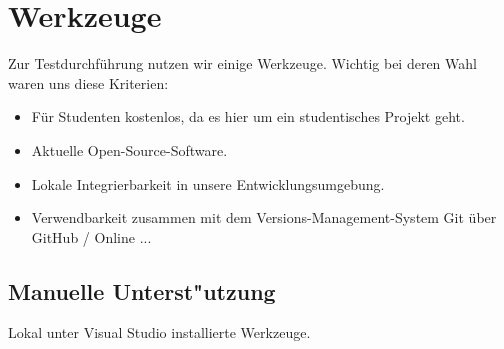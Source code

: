 %



\section{Werkzeuge}
\label{Abschnitt:Tests:Werkzeuge}

Zur Testdurchführung nutzen wir einige Werkzeuge. Wichtig bei deren Wahl waren uns diese Kriterien:

\begin{itemize}

	\item Für Studenten kostenlos, da es hier um ein studentisches Projekt geht.
	\item Aktuelle Open-Source-Software.
	\item Lokale Integrierbarkeit in unsere Entwicklungsumgebung.
	\item Verwendbarkeit zusammen mit dem Versions-Management-System Git über GitHub / Online ... %

\end{itemize}

\subsection{Manuelle Unterst{"u}tzung}
\label{Abschnitt:Programmfehler:Werkzeuge:Manuell}

Lokal unter Visual Studio installierte Werkzeuge.
\\
\\

